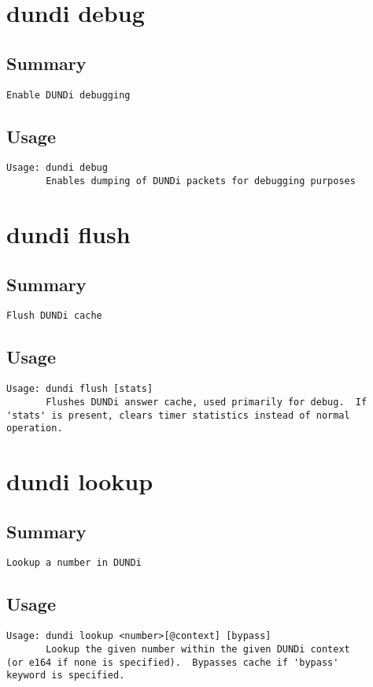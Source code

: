 \section{dundi debug}
\subsection{Summary}
\begin{verbatim}
Enable DUNDi debugging
\end{verbatim}
\subsection{Usage}
\begin{verbatim}
Usage: dundi debug
       Enables dumping of DUNDi packets for debugging purposes

\end{verbatim}


\section{dundi flush}
\subsection{Summary}
\begin{verbatim}
Flush DUNDi cache
\end{verbatim}
\subsection{Usage}
\begin{verbatim}
Usage: dundi flush [stats]
       Flushes DUNDi answer cache, used primarily for debug.  If
'stats' is present, clears timer statistics instead of normal
operation.

\end{verbatim}


\section{dundi lookup}
\subsection{Summary}
\begin{verbatim}
Lookup a number in DUNDi
\end{verbatim}
\subsection{Usage}
\begin{verbatim}
Usage: dundi lookup <number>[@context] [bypass]
       Lookup the given number within the given DUNDi context
(or e164 if none is specified).  Bypasses cache if 'bypass'
keyword is specified.

\end{verbatim}


